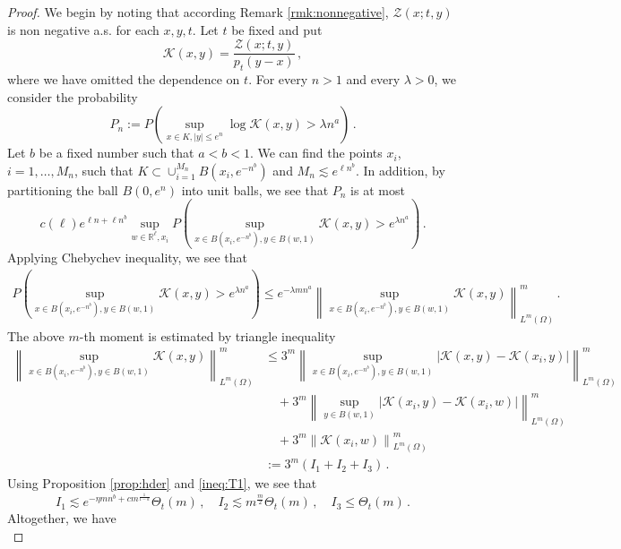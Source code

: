\documentclass[12pt,reqno]{amsart}
\theoremstyle{remark}
\newcommand{\1}{\mathbf{1}}
\def\RR{\mathbb{R}}
\def\Z{\mathcal{Z}}
\def\K{\mathcal{K}}
\def\lt{\left}
\def\rt{\right}
\begin{document}
	\begin{proof}%
	We begin by noting that according Remark \ref{rmk:nonnegative}, $\Z(x;t,y)$ is non negative a.s. for each $x,y,t$. Let $t$ be fixed and put
	\begin{equation*}
		\K(x,y)=\frac{\Z(x;t,y)}{p_t(y-x)}\,,
	\end{equation*}
	where we have omitted the dependence on $t$.
	For every $n>1$ and every $\lambda>0$, we consider the probability
	\begin{equation*}
		P_n:=P\left(\sup_{x\in K,|y|\le e^n}\log\K(x,y)> \lambda n^a\right)\,.
	\end{equation*}
	Let $b$ be a fixed number such that $a < b <1$. We can find the points $x_i$, $i = 1, \dots, M_{n}$, such that $K \subset \cup_{i=1}^{M_n}B(x_i, e^{-n^b})$ and $M_n\lesssim e^{\ell n^b}$. In addition, by partitioning the ball $B(0,e^n)$ into unit balls, we see that $P_n$ is at most
	\begin{equation*}
		c(\ell) e^{\ell n+\ell n^b}\sup_{w\in\RR^\ell, x_i}P\left(\sup_{x\in B(x_i, e^{-n^b}), y\in B(w,1)}\K(x,y)> e^{\lambda n^a}\right)\,. 
	\end{equation*}
	Applying Chebychev inequality, we see that
	\begin{align*}
		P\left(\sup_{x\in B(x_i, e^{-n^b}),y\in B(w,1)}\K(x,y)> e^{\lambda n^a}\right)
		\le e^{-\lambda m n^a}\lt\|\sup_{x\in B(x_i, e^{-n^b}),y\in B(w,1)}\K(x,y) \rt\|_{L^m(\Omega)}^m\,.
	\end{align*}
	The above $m$-th moment is estimated by triangle inequality
	\begin{align*}
	\lt\|\sup_{{x\in B(x_i, e^{-n^b})},y\in B(w,1)}\K(x,y) \rt\|_{L^m(\Omega)}^m
	&\leq 3^m \left\|\sup_{{x\in B(x_i, e^{-n^b})},y\in B(w,1)} \left|\K(x,y)-\K(x_i,y)\right|\right\|_{L^m(\Omega)}^m\\
	&\quad+ 3^m \left\|\sup_{y\in B(w,1)} \left|\K(x_i,y)-\K(x_i,w)\right|\right\|_{L^m(\Omega)}^m\\
	& \quad + 3^m \left\|\K(x_i,w)\right\|_{L^m(\Omega)}^m\\
	&:=3^m( I_1 + I_2 + I_3)\,.
	\end{align*}
Using Proposition \ref{prop:hder} and \eqref{ineq:T1}, we see that 
\begin{equation}
I_1\lesssim  e^{-\eta m n^b+ c m ^{\frac1{1-a}}} \Theta_t(m)\,, \quad I_2 \lesssim   m^{\frac m2} \Theta_t(m)\,, \quad I_3\le  \Theta_t(m)\,.
\end{equation}
Altogether, we have
\begin{equation*}

\end{equation*}
\end{proof}
\end{document}
